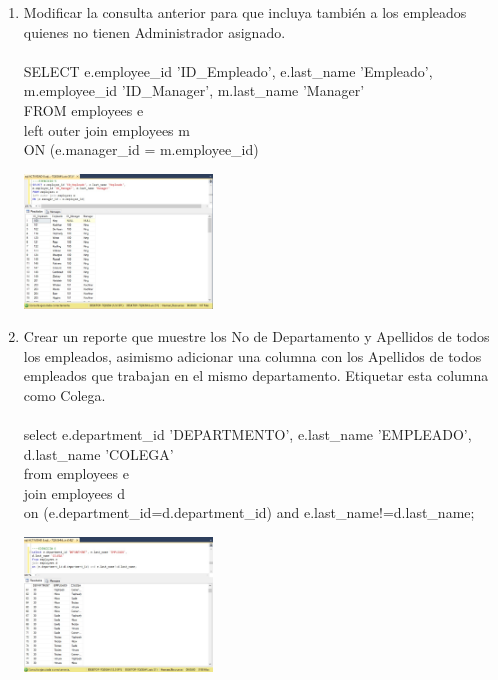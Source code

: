 \begin{enumerate}[1.]
	\item Modificar la consulta anterior para que incluya tambi\'en a los empleados quienes no tienen Administrador asignado.
	\\
	\\SELECT e.employee\_id 'ID\_Empleado', e.last\_name 'Empleado', 
	\\m.employee\_id 'ID\_Manager', m.last\_name 'Manager' 
	\\FROM employees e 
	\\left outer join employees m
	\\ON (e.manager\_id = m.employee\_id)

	\begin{center}
	\includegraphics[width=5cm]{./Imagenes/8ejer5} 
	\end{center}

	\item Crear un reporte que muestre los No de Departamento y Apellidos de todos los empleados, asimismo adicionar una columna con los Apellidos de todos empleados que trabajan en el mismo departamento. Etiquetar esta columna como Colega.
	\\
	\\select e.department\_id 'DEPARTMENTO', e.last\_name 'EMPLEADO', 
	\\d.last\_name 'COLEGA' 
	\\from employees e 
	\\join employees d 
	\\on (e.department\_id=d.department\_id) and e.last\_name!=d.last\_name;\\

	\begin{center}
	\includegraphics[width=5cm]{./Imagenes/8ejer6} 
	\end{center}


\end{enumerate}
